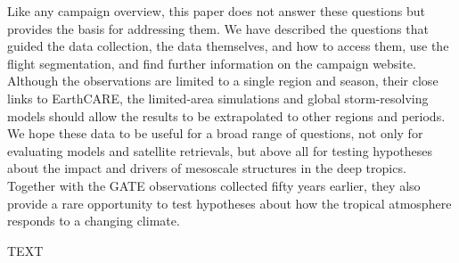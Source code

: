 \documentclass[acp, manuscript]{copernicus}
\begin{document}
Like any campaign overview, this paper does not answer these questions but provides the basis for addressing them. We have described the questions that guided the data collection, the data themselves, and how to access them, use the flight segmentation, and find further information on the campaign website. Although the observations are limited to a single region and season, their close links to EarthCARE, the limited-area simulations and global storm-resolving models should allow the results to be extrapolated to other regions and periods. We hope these data to be useful for a broad range of questions, not only for evaluating models and satellite retrievals, but above all for testing hypotheses about the impact and drivers of mesoscale structures in the deep tropics. Together with the GATE observations collected fifty years earlier, they also provide a rare opportunity to test hypotheses about how the tropical atmosphere responds to a changing climate.





\begin{acknowledgements}
TEXT
\end{acknowledgements}




\end{document}
